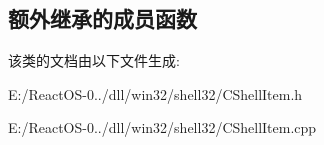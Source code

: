 \subsection*{额外继承的成员函数}


该类的文档由以下文件生成\+:\begin{DoxyCompactItemize}
\item 
E\+:/\+React\+O\+S-\/0../dll/win32/shell32/C\+Shell\+Item.\+h\item 
E\+:/\+React\+O\+S-\/0../dll/win32/shell32/C\+Shell\+Item.\+cpp\end{DoxyCompactItemize}

